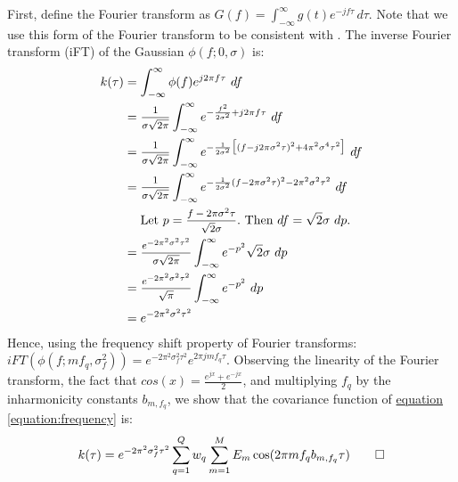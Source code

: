 \begin{appendices}
\footnotesize
First, define the Fourier transform as $G(f) = \int_{-\infty}^\infty g(t) e^{-j f \tau} \, d\tau $. Note that we  use this form of the Fourier transform to be consistent with \cite{wilson_2013_gaussian}.
The inverse Fourier transform (iFT) of the Gaussian $\phi(f; 0, \sigma)$ is:
\begin{align*} 
k(\tau) 
&= \medint\int_{-\infty}^{\infty} \phi(f)e^{j 2\pi f\tau} \ df \\
&= \mfrac1 {\sigma \sqrt{2\pi}}\medint\int_{-\infty}^{\infty}e^{-\frac{f^2}{2\sigma^2} + j2\pi f\tau} \ df \\
&= \mfrac1 {\sigma \sqrt{2\pi}}\medint\int_{-\infty}^{\infty}e^{-\frac{1}{2\sigma^2} \big[(f-j2\pi \sigma^2 \tau)^2 + 4\pi^2 \sigma^4 \tau^2 \big]} \ df \\
&= \mfrac1 {\sigma \sqrt{2\pi}}\medint\int_{-\infty}^{\infty}e^{-\frac{1}{2\sigma^2}(f-2\pi \sigma^2 \tau)^2 - 2\pi^2 \sigma^2 \tau^2} \ df 
\\ & \ \ \ \  \text{Let } p = \mfrac{f-2\pi \sigma^2 \tau}{\sqrt 2 \sigma}. \text{ Then } df = \sqrt2 \sigma \  dp. \\
&= \mfrac {e^{- 2\pi^2 \sigma^2 \tau^2}} {\sigma \sqrt{2\pi}}\medint\int_{-\infty}^{\infty} e^{-p^2} \sqrt 2 \sigma \ dp \\
&= \mfrac {e^{- 2\pi^2 \sigma^2 \tau^2}} {\sqrt{\pi}}\medint\int_{-\infty}^{\infty} e^{-p^2} \ dp \\
&= e^{-2\pi^2 \sigma^2 \tau^2} 
\end{align*}
Hence, using the frequency shift property of Fourier transforms: $iFT(\phi(f; m f_q, \sigma^2_f )) =  e^{-2\pi^2 \sigma_f^2\tau^2} e^{2\pi j m f_q \tau}$. Observing the linearity of the Fourier transform, the fact that $cos(x) = \frac{e^{jx} + e^{-jx}}{2}$, and multiplying $f_q$ by the inharmonicity constants $b_{m,f_q}$, we show that the covariance function of \hyperref[equation:frequency]{equation \ref*{equation:frequency}} is: 
\begin{align*}
k(\tau) = e^{-2\pi^2\sigma_f^2 \tau^2} \sum_{q=1}^Q w_q \sum_{m=1}^M E_m \cos(2\pi m f_{q} b_{m,f_q}  \tau) \qed
\end{align*}
\end{appendices}